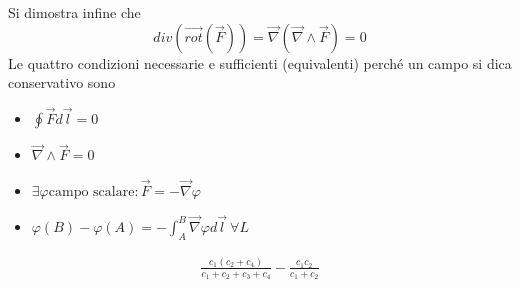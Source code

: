 \documentclass[10pt,a4paper]{article}
\begin{document}
Si dimostra infine che 
\[div(\vec{rot}(\vec{F})) =\vec{\nabla}(\vec{\nabla}\wedge\vec{F})=0\]
Le quattro condizioni necessarie e sufficienti (equivalenti) perché un campo si dica conservativo sono
\begin{itemize}
	\item \(\oint \vec{F}d\vec{l} = 0 \)
	\item \(\vec{\nabla}\wedge\vec{F} = 0\)
	\item \(\exists\varphi \text{campo scalare} : \vec{F}=-\vec{\nabla}\varphi\)
	\item \(\varphi(B)-\varphi(A) = -\int_{A}^{B}\vec{\nabla}\varphi d\vec{l}\ \forall L\)
\end{itemize}
\begin{align*}
\frac{c_1(c_2+c_4)}{c_1+c_2+c_3+c_4}-\frac{c_1c_2}{c_1+c_2}
\end{align*}
\end{document}
